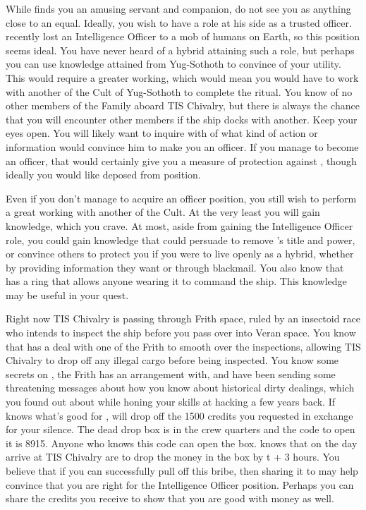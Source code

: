 \documentclass[char]{guildcamp4}
\begin{document}
While \cVone{} finds you an amusing servant and companion, \cVone{\they} do not see you as anything close to an equal. Ideally, you wish to have a role at his side as a trusted officer. \cVone{} recently lost an Intelligence Officer to a mob of humans on Earth, so this position seems ideal. You have never heard of a hybrid attaining such a role, but perhaps you can use knowledge attained from Yug-Sothoth to convince \cVone{} of your utility. This would require a greater working, which would mean you would have to work with another of the Cult of Yug-Sothoth to complete the ritual. You know of no other members of the Family aboard TIS Chivalry, but there is always the chance that you will encounter other members if the ship docks with another. Keep your eyes open. You will likely want to inquire with \cVone{} of what kind of action or information would convince him to make you an officer. If you manage to become an officer, that would certainly give you a measure of protection against \cVthree{}, though ideally you would like \cVthree{\them} deposed from \cVthree{\their} position.

Even if you don't manage to acquire an officer position, you still wish to perform a great working with another of the Cult. At the very least you will gain knowledge, which you crave. At most, aside from gaining the Intelligence Officer role, you could gain knowledge that could persuade \cVone{} to remove \cVthree{}'s title and power, or convince others to protect you if you were to live openly as a hybrid, whether by providing information they want or through blackmail. You also know that \cVone{} has a ring that allows anyone wearing it to command the ship. This knowledge may be useful in your quest.

Right now TIS Chivalry is passing through Frith space, ruled by an insectoid race who intends to inspect the ship before you pass over into Veran space. You know that \cVone{} has a deal with one of the Frith to smooth over the inspections, allowing TIS Chivalry to drop off any illegal cargo before being inspected. You know some secrets on \cCbad{}, the Frith \cVone{} has an arrangement with, and have been sending \cCbad{\them} some threatening messages about how you know about \cCbad{\their} historical dirty dealings, which you found out about while honing your skills at hacking a few years back. If \cCbad{} knows what's good for \cCbad{\them}, \cCbad{\they} will drop off the 1500 credits you requested in exchange for your silence. The dead drop box is in the crew quarters and the code to open it is 8915. Anyone who knows this code can open the box. \cCbad{} knows that on the day \cCbad{\they} arrive at TIS Chivalry \cCbad{\they} are to drop the money in the box by t + 3 hours. You believe that if you can successfully pull off this bribe, then sharing it to \cVone{} may help convince \cVone{\them} that you are right for the Intelligence Officer position. Perhaps you can share the credits you receive to show that you are good with money as well.
\end{document}
